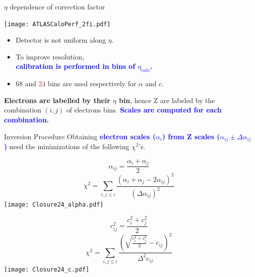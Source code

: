 \begin{frame}{$\eta$ dependence of correction factor}
  \begin{minipage}{0.49\linewidth}
    \texttt{[image: ATLASCaloPerf\_2fi.pdf]}
  \end{minipage}
  \begin{minipage}{0.49\linewidth}
    \begin{itemize}
    \item Detector is not uniform along $\eta$.
    \item To improve resolution, \\ \textcolor{blue}{\bf calibration is performed in bins of $\eta_{calo}$.}
    \item 68 and \textcolor{brown}{24} bins are used respectively for $\alpha$ and $c$.\\
    \end{itemize}
  \end{minipage}
  \vfill
  {\bf Electrons are labelled by their $\eta$ bin}, hence Z are labeled by the combination $(i, j)$ of electrons bins.
  \textcolor{blue}{\bf Scales are computed for each combination.}
\end{frame}


\begin{frame}{Inversion Procedure}
Obtaining \textcolor{blue}{\bf electron scales ($\alpha_i$) from Z scales ($\alpha_{ij} \pm \Delta\alpha_{ij}$)} need the minimizations of the following $\chi^2$'s.\\
\begin{minipage}{0.49\linewidth}
  $$\alpha_{ij} = \frac{\alpha_i+\alpha_j}{2}$$
  $$\chi^2 = \sum \limits_{i, j\leq i} \frac{ (\alpha_i + \alpha_j - 2\alpha_{ij})^2 }{(\Delta\alpha_{ij})^2}$$
  \texttt{[image: Closure24\_alpha.pdf]}
\end{minipage}
\hfill
\begin{minipage}{0.49\linewidth}
  $$c_{ij}^2 = \frac{c^2_i + c_j^2}{2}$$
  $$\chi^2 = \sum \limits_{i, j\leq i} \frac{ (\sqrt{\frac{c_i^2 + c_j^2}{2}} - c_{ij})^2 }{\Delta^2 c_{ij}}$$
  \texttt{[image: Closure24\_c.pdf]}
\end{minipage}

\end{frame}

